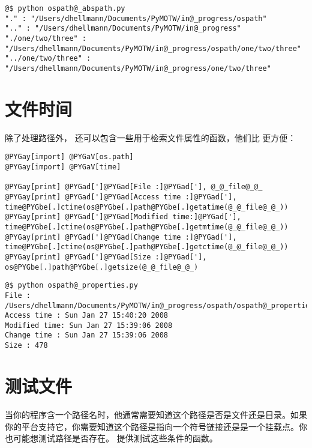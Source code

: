 \documentclass[a4paper,10pt,english]{manual}
\begin{document}
\begin{Verbatim}[commandchars=@\[\]]
@$ python ospath@_abspath.py
"." : "/Users/dhellmann/Documents/PyMOTW/in@_progress/ospath"
".." : "/Users/dhellmann/Documents/PyMOTW/in@_progress"
"./one/two/three" : "/Users/dhellmann/Documents/PyMOTW/in@_progress/ospath/one/two/three"
"../one/two/three" : "/Users/dhellmann/Documents/PyMOTW/in@_progress/one/two/three"
\end{Verbatim}


\section{文件时间}

除了处理路径外，  还可以包含一些用于检索文件属性的函数，他们比  更方便：

\begin{Verbatim}[commandchars=@\[\]]
@PYGay[import] @PYGaV[os.path]
@PYGay[import] @PYGaV[time]

@PYGay[print] @PYGad[']@PYGad[File :]@PYGad['], @_@_file@_@_
@PYGay[print] @PYGad[']@PYGad[Access time :]@PYGad['], time@PYGbe[.]ctime(os@PYGbe[.]path@PYGbe[.]getatime(@_@_file@_@_))
@PYGay[print] @PYGad[']@PYGad[Modified time:]@PYGad['], time@PYGbe[.]ctime(os@PYGbe[.]path@PYGbe[.]getmtime(@_@_file@_@_))
@PYGay[print] @PYGad[']@PYGad[Change time :]@PYGad['], time@PYGbe[.]ctime(os@PYGbe[.]path@PYGbe[.]getctime(@_@_file@_@_))
@PYGay[print] @PYGad[']@PYGad[Size :]@PYGad['], os@PYGbe[.]path@PYGbe[.]getsize(@_@_file@_@_)
\end{Verbatim}

\begin{Verbatim}[commandchars=@\[\]]
@$ python ospath@_properties.py
File : /Users/dhellmann/Documents/PyMOTW/in@_progress/ospath/ospath@_properties.py
Access time : Sun Jan 27 15:40:20 2008
Modified time: Sun Jan 27 15:39:06 2008
Change time : Sun Jan 27 15:39:06 2008
Size : 478
\end{Verbatim}


\section{测试文件}

当你的程序含一个路径名时，他通常需要知道这个路径是否是文件还是目录。如果你的平台支持它，你需要知道这个路径是指向一个符号链接还是是一个挂载点。你也可能想测试路径是否存在。  提供测试这些条件的函数。
\end{document}
